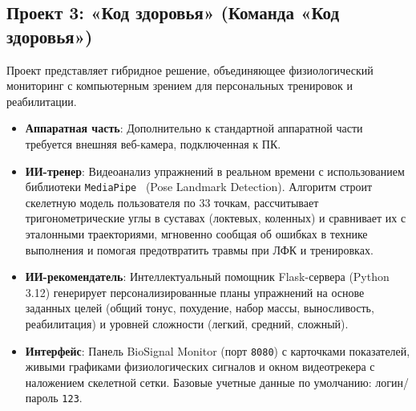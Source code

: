 \documentclass[utf8, russian]{eskdtext}
\begin{document}
\subsection{Проект 3: «Код здоровья» (Команда «Код здоровья»)}
Проект представляет гибридное решение, объединяющее физиологический мониторинг с компьютерным зрением для персональных тренировок и реабилитации.
\begin{itemize}
    \item \textbf{Аппаратная часть}: Дополнительно к стандартной аппаратной части требуется внешняя веб-камера, подключенная к ПК.
    \item \textbf{ИИ-тренер}: Видеоанализ упражнений в реальном времени с использованием библиотеки \texttt{MediaPipe}~\cite{mediapipe_docs} (Pose Landmark Detection). Алгоритм строит скелетную модель пользователя по 33 точкам, рассчитывает тригонометрические углы в суставах (локтевых, коленных) и сравнивает их с эталонными траекториями, мгновенно сообщая об ошибках в технике выполнения и помогая предотвратить травмы при ЛФК и тренировках.
    \item \textbf{ИИ-рекомендатель}: Интеллектуальный помощник Flask-сервера (Python 3.12) генерирует персонализированные планы упражнений на основе заданных целей (общий тонус, похудение, набор массы, выносливость, реабилитация) и уровней сложности (легкий, средний, сложный).
    \item \textbf{Интерфейс}: Панель BioSignal Monitor (порт \texttt{8080}) с карточками показателей, живыми графиками физиологических сигналов и окном видеотрекера с наложением скелетной сетки. Базовые учетные данные по умолчанию: логин/пароль \texttt{123}.
\end{itemize}
\end{document}
